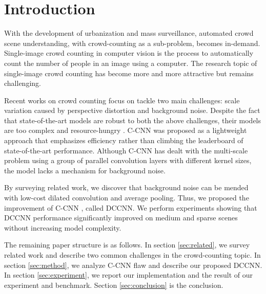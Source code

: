 \section{Introduction}







With the development of urbanization and mass surveillance, automated crowd scene understanding, with crowd-counting as a sub-problem, becomes in-demand. Single-image crowd counting in computer vision is the process to automatically count the number of people in an image using a computer. The research topic of single-image crowd counting has become more and more attractive but remains challenging.


Recent works on crowd counting focus on tackle two main challenges: scale variation caused by perspective distortion and background noise. Despite the fact that state-of-the-art models are robust to both the above challenges, their models are too complex and resource-hungry \cite{liu2019context, jiang2019crowd, liu2019adcrowdnet, amirgholipour2020pdanet}. C-CNN \cite{9053780} was proposed as a lightweight approach that emphasizes efficiency rather than climbing the leaderboard of state-of-the-art performance. Although C-CNN \cite{9053780} has dealt with the multi-scale problem using a group of parallel convolution layers with different kernel sizes, the model lacks a mechanism for background noise. 


By surveying related work, we discover that background noise can be mended with low-cost dilated convolution and average pooling. Thus, we proposed the improvement of C-CNN \cite{9053780}, called DCCNN. We perform experiments showing that DCCNN performance significantly improved on medium and sparse scenes without increasing model complexity.

The remaining paper structure is as follows. In section \ref{sec:related}, we survey related work and describe two common challenges in the crowd-counting topic. In section \ref{sec:method}, we analyze C-CNN \cite{9053780} flaw and describe our proposed DCCNN. In section \ref{sec:experiment}, we report our implementation and the result of our experiment and benchmark. Section \ref{sec:conclusion} is the conclusion.
